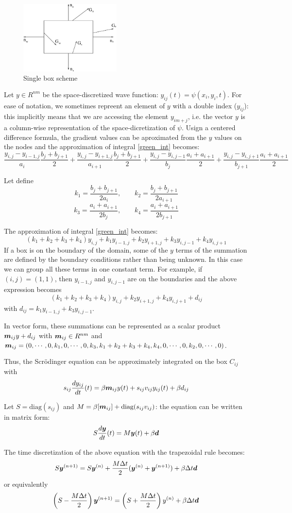 \documentclass[a4paper,11pt]{article}
\newcommand{\ve}[1]{\mbox{\boldmath $ #1$}}
\begin{document}
\begin{figure}
 \label{fig:single_box}
\centerline{\includegraphics[width=2in] {box.eps}}
\caption{Single box scheme}
\end{figure}

Let $y \in R^{nm}$ be the space-discretized wave function: $y_{ij}(t) = \psi(x_i, y_i, t)$. For ease of notation, we sometimes repreent an element of $y$ with a double index ($y_{ij}$): this implicitly means that we are accessing the element $y_{im+j}$, i.e. the vector $y$ is a column-wise representation of the space-dicretization of $\psi$.
Usign a centered difference formula, the gradient values can be aproximated from the $y$ values on the nodes and the approximation of integral \ref{green_int} becomes:
$$ \frac{y_{i,j}-y_{i-1,j}}{a_i} \frac{b_j+b_{j+1}}{2} +
   \frac{y_{i,j}-y_{i+1,j}}{a_{i+1}} \frac{b_j+b_{j+1}}{2} +
   \frac{y_{i,j}-y_{i,j-1}}{b_j} \frac{a_i+a_{i+1}}{2} +
   \frac{y_{i,j}-y_{i,j+1}}{b_{j+1}} \frac{a_i+a_{i+1}}{2} $$

Let define
$$ k_1 = \frac{b_j+b_{j+1}}{2a_i}, \qquad k_2 = \frac{b_j+b_{j+1}}{2a_{i+1}} $$
$$ k_3 = \frac{a_i+a_{i+1}}{2b_j}, \qquad k_4 = \frac{a_i+a_{i+1}}{2b_{j+1}} $$

The approximation of integral \ref{green_int} becomes:
$$ (k_1+k_2+k_3+k_4) y_{i, j} + k_1 y_{i-1,j} + k_2 y_{i+1,j} + k_3 y_{i,j-1} + k_4 y_{i,j+1} $$
If a box is on the boundary of the domain, some of the $y$ terms of the summation are defined by the boundary conditions rather than being unknown. In this case we can group all these terms in one constant term. For example, if $(i, j) = (1, 1)$, then $y_{i-1,j}$ and $y_{i,j-1}$ are on the boundaries and the above expression becomes
$$ (k_1+k_2+k_3+k_4) y_{i, j} + k_2 y_{i+1,j} + k_4 y_{i,j+1} + d_{ij}$$
with $ d_{ij} = k_1 y_{i-1,j} + k_3 y_{i,j-1} $.

In vector form, these summations can be represented as a scalar product $\ve m_{ij} y + d_{ij}$ with $\ve m_{ij} \in R^{nm}$ and
$\ve m_{ij} = (0,\cdots, 0, k_1, 0, \cdots, 0, k_3, k_1+k_2+k_3+k_4, k_4, 0,\cdots, 0, k_2, 0, \cdots, 0)$.

Thus, the Scr\"{o}dinger equation can be approximately integrated on the box $C_{ij}$ with
$$ s_{ij} \frac{d y_{ij}}{dt}(t) =  \beta \ve m_{ij} y(t) + s_{ij} v_{ij} y_{ij}(t) + \beta d_{ij}$$

Let $S = \mbox{diag}(s_{ij})$ and $M = \beta [\ve m_{ij}] + \mbox{diag}(s_{ij}v_{ij})$: the equation can be written in matrix form:
$$ S \frac{d \ve y}{dt}(t) = M \ve y(t) + \beta \ve d$$

The time discretization of the above equation with the trapezoidal rule becomes:
$$ S \ve y^{(n+1)} = S \ve y^{(n)} + \frac{M \Delta t}{2} (\ve y^{(n)} + \ve y^{(n+1)}) + \beta \Delta t \ve d$$
or equivalently
$$ \left( S - \frac{M \Delta t}{2} \right) \ve y^{(n+1)} = \left( S + \frac{M \Delta t}{2} \right) y^{(n)} + \beta \Delta t \ve d $$
\end{document}
